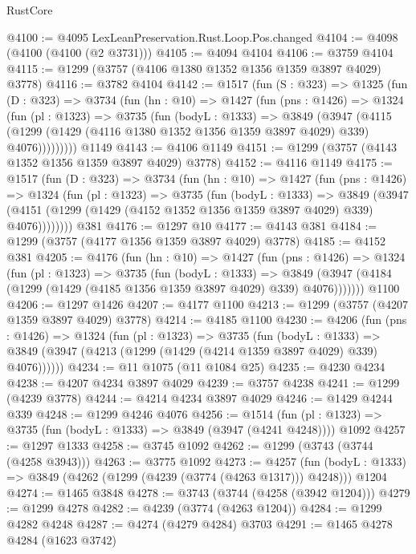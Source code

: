 \begin{lexlean}{RustCore}
\begin{coremodule}
@4100 := @4095 LexLeanPreservation.Rust.Loop.Pos.changed
@4104 := @4098 (@4100 (@4100 (@2 @3731)))
@4105 := @4094 @4104
@4106 := @3759 @4104
@4115 := @1299 (@3757 (@4106 @1380 @1352 @1356 @1359 @3897 @4029) @3778)
@4116 := @3782 @4104
@4142 := @1517
    (fun (S : @323) =>
    @1325
      (fun (D : @323) =>
      @3734
        (fun (hn : @10) =>
        @1427
          (fun (pns : @1426) =>
          @1324
            (fun (pl : @1323) =>
            @3735
              (fun (bodyL : @1333) =>
              @3849
                (@3947
                  (@4115
                    (@1299 (@1429 (@4116 @1380 @1352 @1356 @1359 @3897 @4029) @339) @4076)))))))))
    @1149
@4143 := @4106 @1149
@4151 := @1299 (@3757 (@4143 @1352 @1356 @1359 @3897 @4029) @3778)
@4152 := @4116 @1149
@4175 := @1517
    (fun (D : @323) =>
    @3734
      (fun (hn : @10) =>
      @1427
        (fun (pns : @1426) =>
        @1324
          (fun (pl : @1323) =>
          @3735
            (fun (bodyL : @1333) =>
            @3849
              (@3947 (@4151 (@1299 (@1429 (@4152 @1352 @1356 @1359 @3897 @4029) @339) @4076))))))))
    @381
@4176 := @1297 @10
@4177 := @4143 @381
@4184 := @1299 (@3757 (@4177 @1356 @1359 @3897 @4029) @3778)
@4185 := @4152 @381
@4205 := @4176
    (fun (hn : @10) =>
    @1427
      (fun (pns : @1426) =>
      @1324
        (fun (pl : @1323) =>
        @3735
          (fun (bodyL : @1333) =>
          @3849 (@3947 (@4184 (@1299 (@1429 (@4185 @1356 @1359 @3897 @4029) @339) @4076)))))))
    @1100
@4206 := @1297 @1426
@4207 := @4177 @1100
@4213 := @1299 (@3757 (@4207 @1359 @3897 @4029) @3778)
@4214 := @4185 @1100
@4230 := @4206
    (fun (pns : @1426) =>
    @1324
      (fun (pl : @1323) =>
      @3735
        (fun (bodyL : @1333) =>
        @3849 (@3947 (@4213 (@1299 (@1429 (@4214 @1359 @3897 @4029) @339) @4076))))))
@4234 := @11 @1075 (@11 @1084 @25)
@4235 := @4230 @4234
@4238 := @4207 @4234 @3897 @4029
@4239 := @3757 @4238
@4241 := @1299 (@4239 @3778)
@4244 := @4214 @4234 @3897 @4029
@4246 := @1429 @4244 @339
@4248 := @1299 @4246 @4076
@4256 := @1514
    (fun (pl : @1323) => @3735 (fun (bodyL : @1333) => @3849 (@3947 (@4241 @4248))))
    @1092
@4257 := @1297 @1333
@4258 := @3745 @1092
@4262 := @1299 (@3743 (@3744 (@4258 @3943)))
@4263 := @3775 @1092
@4273 := @4257
    (fun (bodyL : @1333) => @3849 (@4262 (@1299 (@4239 (@3774 (@4263 @1317))) @4248)))
    @1204
@4274 := @1465 @3848
@4278 := @3743 (@3744 (@4258 (@3942 @1204)))
@4279 := @1299 @4278
@4282 := @4239 (@3774 (@4263 @1204))
@4284 := @1299 @4282 @4248
@4287 := @4274 (@4279 @4284) @3703
@4291 := @1465 @4278 @4284 (@1623 @3742)

\end{coremodule}
\end{lexlean}
